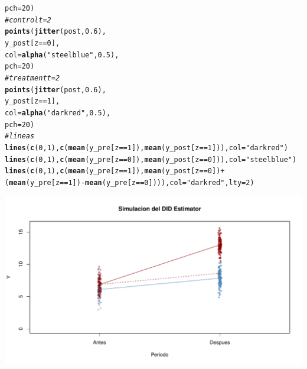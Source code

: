 \documentclass[onesided]{article}\usepackage[]{graphicx}\usepackage[]{color}
\makeatletter
\def\maxwidth{ %
  \ifdim\Gin@nat@width>\linewidth
    \linewidth
  \else
    \Gin@nat@width
  \fi
}
\newcommand{\hlnum}[1]{\textcolor[rgb]{0.686,0.059,0.569}{#1}}%
\newcommand{\hlstr}[1]{\textcolor[rgb]{0.192,0.494,0.8}{#1}}%
\newcommand{\hlcom}[1]{\textcolor[rgb]{0.678,0.584,0.686}{\textit{#1}}}%
\newcommand{\hlopt}[1]{\textcolor[rgb]{0,0,0}{#1}}%
\newcommand{\hlstd}[1]{\textcolor[rgb]{0.345,0.345,0.345}{#1}}%
\newcommand{\hlkwc}[1]{\textcolor[rgb]{0.333,0.667,0.333}{#1}}%
\newcommand{\hlkwd}[1]{\textcolor[rgb]{0.737,0.353,0.396}{\textbf{#1}}}%
\newenvironment{kframe}{%
 \def\at@end@of@kframe{}%
 \ifinner\ifhmode%
  \def\at@end@of@kframe{\end{minipage}}%
  \begin{minipage}{\columnwidth}%
 \fi\fi%
 \def\FrameCommand##1{\hskip\@totalleftmargin \hskip-\fboxsep
 \colorbox{shadecolor}{##1}\hskip-\fboxsep
     \hskip-\linewidth \hskip-\@totalleftmargin \hskip\columnwidth}%
 \MakeFramed {\advance\hsize-\width
   \@totalleftmargin\z@ \linewidth\hsize
   \@setminipage}}%
 {\par\unskip\endMakeFramed%
 \at@end@of@kframe}
\newenvironment{knitrout}{}{} %
\makeatother
\begin{document}
\begin{knitrout}
\begin{kframe}
\begin{alltt}
       \hlkwc{pch} \hlstd{=} \hlnum{20}\hlstd{)}
\hlcom{# control t=2}
\hlkwd{points}\hlstd{(}\hlkwd{jitter}\hlstd{(post,} \hlnum{0.6}\hlstd{),}
       \hlstd{y_post[z} \hlopt{==} \hlnum{0}\hlstd{],}
       \hlkwc{col} \hlstd{=} \hlkwd{alpha}\hlstd{(}\hlstr{"steelblue"}\hlstd{,} \hlnum{0.5}\hlstd{),}
       \hlkwc{pch} \hlstd{=} \hlnum{20}\hlstd{)}
\hlcom{# treatment t=2}
\hlkwd{points}\hlstd{(}\hlkwd{jitter}\hlstd{(post,} \hlnum{0.6}\hlstd{),}
       \hlstd{y_post[z} \hlopt{==} \hlnum{1}\hlstd{],}
       \hlkwc{col} \hlstd{=} \hlkwd{alpha}\hlstd{(}\hlstr{"darkred"}\hlstd{,} \hlnum{0.5}\hlstd{),}
       \hlkwc{pch} \hlstd{=} \hlnum{20}\hlstd{)}
\hlcom{# lineas}
\hlkwd{lines}\hlstd{(}\hlkwd{c}\hlstd{(}\hlnum{0}\hlstd{,} \hlnum{1}\hlstd{),} \hlkwd{c}\hlstd{(}\hlkwd{mean}\hlstd{(y_pre[z} \hlopt{==} \hlnum{1}\hlstd{]),} \hlkwd{mean}\hlstd{(y_post[z} \hlopt{==} \hlnum{1}\hlstd{])),} \hlkwc{col} \hlstd{=} \hlstr{"darkred"}\hlstd{)}
\hlkwd{lines}\hlstd{(}\hlkwd{c}\hlstd{(}\hlnum{0}\hlstd{,} \hlnum{1}\hlstd{),} \hlkwd{c}\hlstd{(}\hlkwd{mean}\hlstd{(y_pre[z} \hlopt{==} \hlnum{0}\hlstd{]),} \hlkwd{mean}\hlstd{(y_post[z} \hlopt{==} \hlnum{0}\hlstd{])),} \hlkwc{col} \hlstd{=} \hlstr{"steelblue"}\hlstd{)}
\hlkwd{lines}\hlstd{(}\hlkwd{c}\hlstd{(}\hlnum{0}\hlstd{,} \hlnum{1}\hlstd{),} \hlkwd{c}\hlstd{(}\hlkwd{mean}\hlstd{(y_pre[z} \hlopt{==} \hlnum{1}\hlstd{]),} \hlkwd{mean}\hlstd{(y_post[z} \hlopt{==} \hlnum{0}\hlstd{])} \hlopt{+}
\hlstd{(}\hlkwd{mean}\hlstd{(y_pre[z} \hlopt{==} \hlnum{1}\hlstd{])}\hlopt{-}\hlkwd{mean}\hlstd{(y_pre[z} \hlopt{==} \hlnum{0}\hlstd{]))),} \hlkwc{col} \hlstd{=} \hlstr{"darkred"}\hlstd{,} \hlkwc{lty} \hlstd{=} \hlnum{2}\hlstd{)}
\end{alltt}
\end{kframe}

{\centering \includegraphics[width=\maxwidth]{figure/dif:dif:Data-1} 

}



\end{knitrout}
\end{document}

